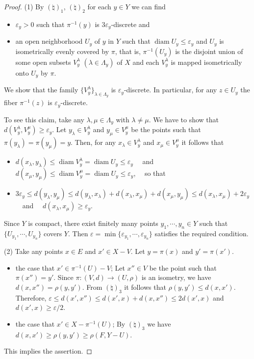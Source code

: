 \documentclass[11pt, fleqn]{amsart}
\theoremstyle{definition}
\newcommand{\diam}{\operatorname{diam}}
\newcommand{\e}{\varepsilon}
\begin{document}
\begin{proof} 
(1) By $(\natural)_1$, $(\natural)_2$ for each $y \in Y$ we can find 
\begin{itemize}
\item[(i)\ ] $\e_y > 0$ such that $\pi^{-1}(y)$ is $3\e_y$-discrete and 
\item[(ii)\,] an open neighborhood $U_y$ of $y$ in $Y$ such that $\diam U_y \leq \e_y$ and $U_y$ is isometrically evenly covered by $\pi$, that is, 
$\pi^{-1}(U_y)$ is the disjoint union of some open subsets $V_y^\lambda$ $(\lambda \in \Lambda_y)$ of $X$ and 
each $V_y^\lambda$ is mapped isometrically onto $U_y$ by $\pi$. 
\end{itemize}
We show that the family $\{ V_y^\lambda \}_{\lambda \in \Lambda_y}$ is $\e_y$-discrete. In particular, for any $z \in U_y$ 
the fiber $\pi^{-1}(z)$ is $\e_y$-discrete. 

To see this claim, take any $\lambda, \mu \in \Lambda_y$ with $\lambda \neq \mu$. 
We have to show that $d(V_y^\lambda, V_y^\mu) \geq \e_y$. 
Let $y_\lambda \in V_y^\lambda$ and $y_\mu \in V_y^\mu$ be the points such that 
$\pi(y_\lambda) = \pi(y_\mu) = y$. 
Then, for any $x_\lambda \in V_y^\lambda$ and $x_\mu \in V_y^\mu$ it follows that 
\begin{itemize}
\item[] $d(x_\lambda, y_\lambda) \leq \diam V_y^\lambda = \diam U_y \leq \e_y$ \ \ and \ \ 
$d(x_\mu, y_\mu) \leq \diam V_y^\mu = \diam U_y \leq \e_y$, \ \ so that 
\vskip 0.5mm 
\item[] $3 \e_y \leq d(y_\lambda, y_\mu) \leq d(y_\lambda, x_\lambda) + d(x_\lambda, x_\mu) + d(x_\mu, y_\mu) \leq d(x_\lambda, x_\mu) + 2 \e_y$ 
\ \ and \ \ $d(x_\lambda, x_\mu) \geq \e_y$. 
\end{itemize}

Since $Y$ is compact, there exist finitely many points $y_1, \cdots, y_n \in Y$ such that $\{ U_{y_1}, \cdots, U_{y_n} \}$ covers $Y$. 
Then $\e = \min \{ \e_{y_1}, \cdots, \e_{y_n} \}$ satisfies the required condition. 

(2) Take any points $x \in E$ and $x' \in X - V$. Let $y = \pi(x)$ and $y' = \pi(x')$. 
\begin{itemize}
\item[(i)\ ] the case that $x' \in \pi^{-1}(U) - V$; Let $x'' \in V$ be the point such that $\pi(x'') = y'$. 
Since $\pi : (V, d) \to (U, \rho)$ is an isometry, we have $d(x, x'') = \rho(y, y')$. 
From $(\natural)_3$ it follows that $\rho(y,y') \leq d(x,x')$.  
Therefore, 
$\e \leq d(x',x'') \leq d(x', x) + d(x, x'') \leq 2d(x', x)$ and $d(x', x) \geq \e/2$. 
\item[(ii)\,] the case that $x' \in X - \pi^{-1}(U)$;  
By $(\natural)_3$ we have $d(x,x') \geq \rho(y,y') \geq \rho(F, Y - U)$.  
\end{itemize}
This implies the assertion. 
\end{proof} 
\end{document}
